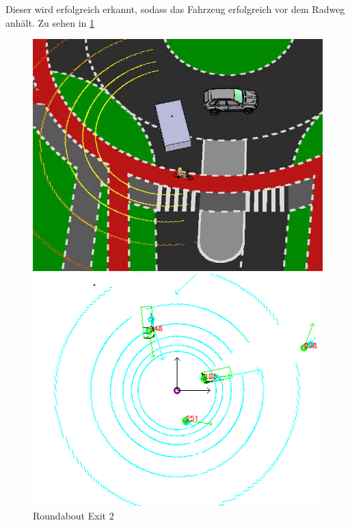 \documentclass[11pt,oneside,openright]{mpreport}
\begin{document}
Dieser wird erfolgreich erkannt, sodass das Fahrzeug erfolgreich vor dem Radweg  anhält. Zu sehen in \cref{roundabout_exit_2}

\begin{figure}[htb]
  \caption{Roundabout Exit 2} 
    \centering
    \begin{minipage}[t]{0.49\textwidth}
        \centering
          \includegraphics[width=\textwidth]{bilder/sim09.png}
    \end{minipage}%
    \hfill
    \begin{minipage}[t]{0.49\textwidth}
        \centering
	\includegraphics[width=\textwidth]{bilder/sim10.png}
    \end{minipage}
    \label{roundabout_exit_2}
\end{figure}
\end{document}
